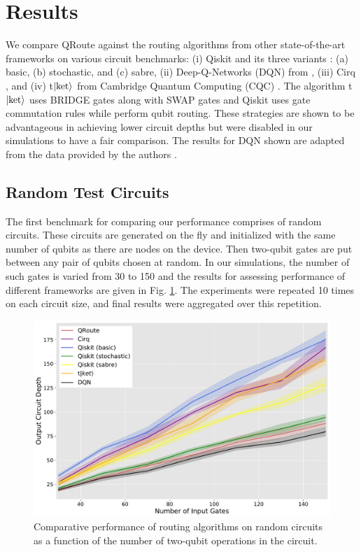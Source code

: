 \documentclass[%
 reprint,
amsmath,amssymb,showkeys,
pra,
]{revtex4-2}
\begin{document}
\section{\label{sec:results}Results}
We compare QRoute against the routing algorithms from other state-of-the-art frameworks on various circuit benchmarks: (i) Qiskit and its three variants \citep{comp_qiskit}: (a) basic, (b) stochastic, and (c) sabre, (ii) Deep-Q-Networks (DQN) from \citep{qroute_dqn2}, (iii) Cirq \citep{comp_cirq}, and (iv) t$\ket{\text{ket}}$ from Cambridge Quantum Computing (CQC) \citep{comp_pytket}. The algorithm t$\ket{\text{ket}}$ uses BRIDGE gates along with SWAP gates and Qiskit uses gate commutation rules while perform qubit routing. These strategies are shown to be advantageous in achieving lower circuit depths \citep{bridge_gate} but were disabled in our simulations to have a fair comparison. The results for DQN shown are adapted from the data provided by the authors \citet{qroute_dqn2}.

\subsection{\label{sec:results-random}Random Test Circuits}

The first benchmark for comparing our performance comprises of random circuits. These circuits are generated on the fly and initialized with the same number of qubits as there are nodes on the device. Then two-qubit gates are put between any pair of qubits chosen at random. In our simulations, the number of such gates is varied from 30 to 150 and the results for assessing performance of different frameworks are given in Fig. \ref{fig:results-random}. The experiments were repeated 10 times on each circuit size, and final results were aggregated over this repetition. 

\begin{figure}[t]
    \includegraphics[width=\linewidth]{images/random_benchmark.pdf}
    \caption{\label{fig:results-random}
        Comparative performance of routing algorithms on random circuits as a function of the number of two-qubit operations in the circuit.}
\end{figure}
\end{document}

